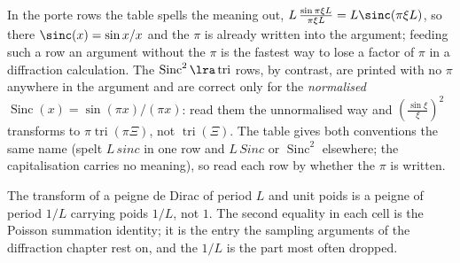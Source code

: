 \begin{remark}
  In the porte rows the table spells the meaning out,
  $L\,\frac{\sin\pi\xi L}{\pi\xi L}=L\sinc(\pi\xi L)$, so there
  $\sinc(x)=\sin x/x$ and the $\pi$ is already written into the argument;
  feeding such a row an argument without the $\pi$ is the fastest way to lose a
  factor of $\pi$ in a diffraction calculation. The
  $\operatorname{Sinc}^2\lra\operatorname{tri}$ rows, by contrast, are printed
  with no $\pi$ anywhere in the argument and are correct only for the
  \emph{normalised} $\operatorname{Sinc}(x)=\sin(\pi x)/(\pi x)$: read them the
  unnormalised way and $\left(\frac{\sin\xi}{\xi}\right)^2$ transforms to
  $\pi\operatorname{tri}(\pi\Xi)$, not $\operatorname{tri}(\Xi)$. The table
  gives both conventions the same name (spelt $L\,sinc$ in one row and
  $L\,Sinc$ or $\operatorname{Sinc}^2$ elsewhere; the capitalisation carries no
  meaning), so read each row by whether the $\pi$ is written.
\end{remark}

\begin{remark}
  The transform of a peigne de Dirac of period $L$ and unit poids is a peigne of
  period $1/L$ carrying poids $1/L$, not $1$. The second equality in each cell
  is the Poisson summation identity; it is the entry the sampling arguments of the
  diffraction chapter rest on, and the $1/L$ is the part most often dropped.
\end{remark}

\begin{figure}[h!]
  \centering
  \hfill
  \caption*{}
\end{figure}

